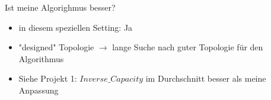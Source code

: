 \documentclass[aspectratio=169,10pt]{beamer}
\begin{document}
\begin{frame}{Ist meine Algorighmus besser?}
\Large
\begin{itemize}
    \item in diesem speziellen Setting: Ja
    \item "designed" Topologie\newline
    $\rightarrow$ lange Suche nach guter Topologie f\"ur den Algorithmus
    \item Siehe Projekt 1: $Inverse\_Capacity$ im Durchschnitt besser als meine Anpassung
\end{itemize}
\end{frame}
\end{document}
